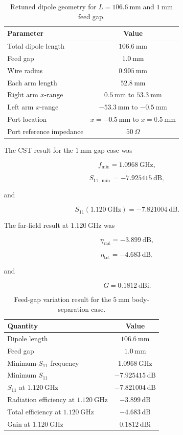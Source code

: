 \begin{table}[htbp]
\centering
\caption{Retuned dipole geometry for \(L=106.6~\mathrm{mm}\) and \(1~\mathrm{mm}\) feed gap.}
\label{tab:gap1-geometry}
\begin{tabular}{lc}
\hline
\textbf{Parameter} & \textbf{Value} \\
\hline
Total dipole length & \(106.6~\mathrm{mm}\) \\
Feed gap & \(1.0~\mathrm{mm}\) \\
Wire radius & \(0.905~\mathrm{mm}\) \\
Each arm length & \(52.8~\mathrm{mm}\) \\
Right arm \(x\)-range & \(0.5~\mathrm{mm}\) to \(53.3~\mathrm{mm}\) \\
Left arm \(x\)-range & \(-53.3~\mathrm{mm}\) to \(-0.5~\mathrm{mm}\) \\
Port location & \(x=-0.5~\mathrm{mm}\) to \(x=0.5~\mathrm{mm}\) \\
Port reference impedance & \(50~\Omega\) \\
\hline
\end{tabular}
\end{table}

The CST result for the \(1~\mathrm{mm}\) gap case was

\[
f_{\min} = 1.0968~\mathrm{GHz},
\]

\[
S_{11,\min} = -7.925415~\mathrm{dB},
\]

and

\[
S_{11}(1.120~\mathrm{GHz}) = -7.821004~\mathrm{dB}.
\]

The far-field result at \(1.120~\mathrm{GHz}\) was

\[
\eta_{\mathrm{rad}} = -3.899~\mathrm{dB},
\]

\[
\eta_{\mathrm{tot}} = -4.683~\mathrm{dB},
\]

and

\[
G = 0.1812~\mathrm{dBi}.
\]

\begin{table}[htbp]
\centering
\caption{Feed-gap variation result for the \(5~\mathrm{mm}\) body-separation case.}
\label{tab:gap1-result}
\begin{tabular}{lc}
\hline
\textbf{Quantity} & \textbf{Value} \\
\hline
Dipole length & \(106.6~\mathrm{mm}\) \\
Feed gap & \(1.0~\mathrm{mm}\) \\
Minimum-\(S_{11}\) frequency & \(1.0968~\mathrm{GHz}\) \\
Minimum \(S_{11}\) & \(-7.925415~\mathrm{dB}\) \\
\(S_{11}\) at \(1.120~\mathrm{GHz}\) & \(-7.821004~\mathrm{dB}\) \\
Radiation efficiency at \(1.120~\mathrm{GHz}\) & \(-3.899~\mathrm{dB}\) \\
Total efficiency at \(1.120~\mathrm{GHz}\) & \(-4.683~\mathrm{dB}\) \\
Gain at \(1.120~\mathrm{GHz}\) & \(0.1812~\mathrm{dBi}\) \\
\hline
\end{tabular}
\end{table}

